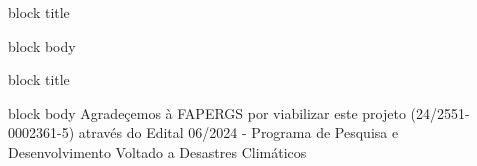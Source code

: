 \documentclass[final]{beamer}
\newlength{\sepwidth}
\newlength{\colwidth}
\newcommand{\separatorcolumn}{\begin{column}{\sepwidth}\end{column}}  %
\begin{document}
\begin{frame}[t]
\begin{columns}[t]
\begin{column}{\colwidth}
\begin{beamercolorbox}[wd=\colwidth, sep=6pt, leftskip=6pt, rightskip=6pt]{block title}
 \fontsize{18}{20}\selectfont {}
\end{beamercolorbox}
\begin{beamercolorbox}[wd=\colwidth, sep=2pt, leftskip=2pt, rightskip=2pt]{block body}
  \nocite{*}
  \printbibliography
  \vspace{4pt}
\end{beamercolorbox}


\begin{beamercolorbox}[wd=\colwidth, sep=6pt, leftskip=6pt, rightskip=6pt]{block title}
 \fontsize{20}{22}\selectfont {}
\end{beamercolorbox}
\begin{beamercolorbox}[wd=\colwidth, sep=2pt, leftskip=2pt, rightskip=2pt]{block body}
  \vspace{-2pt} %
  Agradeçemos à FAPERGS por viabilizar este projeto (24/2551-0002361-5) através do Edital 06/2024 - Programa de Pesquisa e Desenvolvimento Voltado a Desastres Climáticos
  \vspace{4pt}
\end{beamercolorbox}

\end{column}


\separatorcolumn  %

\end{columns}
\end{frame}
\end{document}
